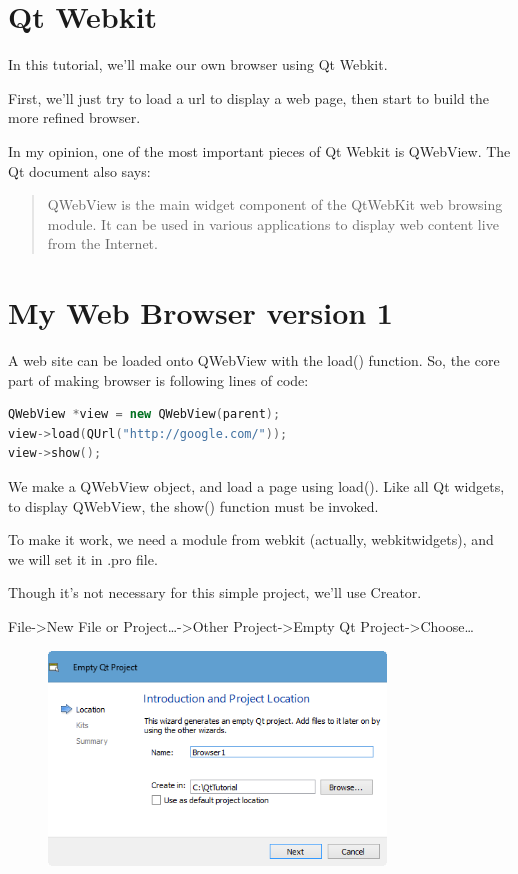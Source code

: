 

\section{Qt Webkit}\label{qt-webkit}

In this tutorial, we'll make our own browser using Qt Webkit.

First, we'll just try to load a url to display a web page, then start to
build the more refined browser.

In my opinion, one of the most important pieces of Qt Webkit is
QWebView. The Qt document also says:

\begin{quote}
QWebView is the main widget component of the QtWebKit web browsing
module. It can be used in various applications to display web content
live from the Internet.
\end{quote}

\section{My Web Browser version 1}\label{my-web-browser-version-1}

A web site can be loaded onto QWebView with the load() function. So, the
core part of making browser is following lines of code:

\begin{lstlisting}[language=c++]
QWebView *view = new QWebView(parent);
view->load(QUrl("http://google.com/"));
view->show();
\end{lstlisting}

We make a QWebView object, and load a page using load(). Like all Qt
widgets, to display QWebView, the show() function must be invoked.

To make it work, we need a module from webkit (actually, webkitwidgets),
and we will set it in .pro file.

Though it's not necessary for this simple project, we'll use Creator.

File-\textgreater{}New File or Project\ldots{}-\textgreater{}Other
Project-\textgreater{}Empty Qt Project-\textgreater{}Choose\ldots{}

\begin{figure}[htbp]
\centering
\includegraphics[width=0.8\textwidth]{images/Browser1_Empty_Project.png}
\caption{}
\end{figure}

